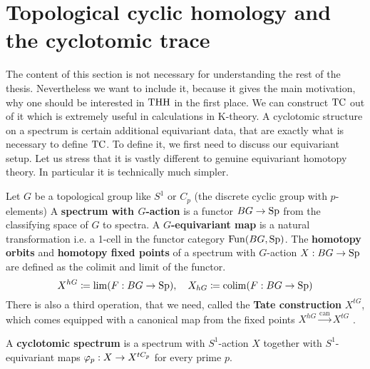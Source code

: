\section{Topological cyclic homology and the cyclotomic trace} \label{TC}
The content of this section is not necessary for understanding the rest of the thesis. Nevertheless we want to include it, because it gives the main motivation, why one should be interested in $\operatorname{THH}$ in the first place. We can construct $\operatorname{TC}$ out of it which is extremely useful in calculations in K-theory. 
A cyclotomic structure on a spectrum is certain additional equivariant data, that are exactly what is necessary to define $\operatorname{TC}$.
To define it, we first need to discuss our equivariant setup. Let us stress that it is vastly different to genuine equivariant homotopy theory. In particular it is technically much simpler.
\begin{defn}
    Let $G$ be a topological group like $S^1$ or $C_p$ (the discrete cyclic group with $p$-elements) 
    A \textbf{spectrum with $G$-action} is a functor $BG\to \operatorname{Sp}$ from the classifying space of $G$ to spectra. A \textbf{$G$-equivariant map} is a natural transformation i.e. a 1-cell in the functor category $\operatorname{Fun}(BG,\operatorname{Sp})$. The \textbf{homotopy orbits} and \textbf{homotopy fixed points} of a spectrum with $G$-action $X:BG\to \operatorname{Sp}$ are defined as the colimit and limit of the functor.
    \begin{equation*}
        X^{hG}\coloneqq \lim(F:BG\to \operatorname{Sp}),\quad X_{hG}\coloneqq \operatorname{colim}(F:BG\to \operatorname{Sp})
    \end{equation*}
    There is also a third operation, that we need, called the \textbf{Tate construction} $X^{tG}$, which comes equipped with a canonical map from the fixed points $X^{hG}\xrightarrow{\mathrm{can}}X^{tG}$ . 
\end{defn}

\begin{defn}\cite[Chapter~2.1]{NS}
A \textbf{cyclotomic spectrum} is a spectrum with $S^1$-action $X$ together with  $S^1$-equivariant maps $\varphi_p: X \rightarrow X^{tC_p}$ for every prime $p$.
\end{defn}

